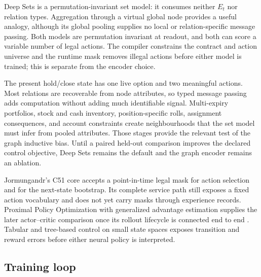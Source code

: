 \documentclass{strategynet-journal}
\begin{document}
Deep Sets is a permutation-invariant set model: it consumes neither \(E_t\) nor
relation types.  Aggregation through a virtual global node provides a useful
analogy, although its global pooling supplies no local or relation-specific
message passing.  Both models
are permutation invariant at readout, and both can score a variable number of
legal actions.  The compiler constrains the contract and action universe and
the runtime mask removes illegal actions before either model is trained; this
is separate from the encoder choice.

The present hold/close state has one live option and two meaningful actions.
Most relations are recoverable from node attributes, so typed message passing
adds computation without adding much identifiable signal.  Multi-expiry
portfolios, stock and cash inventory, position-specific rolls, assignment
consequences, and account constraints create neighbourhoods that the set
model must infer from pooled attributes.  Those stages provide the relevant
test of the graph inductive bias.  Until a paired held-out comparison improves
the declared control objective, Deep Sets remains the default and the graph
encoder remains an ablation.

Jormungandr's C51 core accepts a point-in-time legal mask for action selection
and for the next-state bootstrap.  Its complete service path still exposes a
fixed action vocabulary and does not yet carry masks through experience
records.  Proximal Policy Optimization with generalized advantage estimation
supplies the later actor--critic comparison once its rollout lifecycle is
connected end to end \cite{gae,ppo}.  Tabular and tree-based control on small
state spaces exposes transition and reward errors before either neural policy
is interpreted.

\subsection{Training loop}
\end{document}
